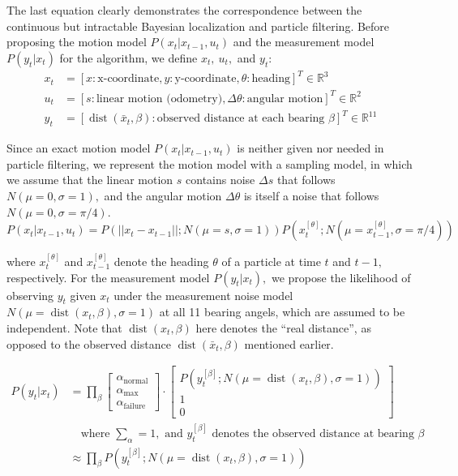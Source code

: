 \documentclass[11pt, a4paper]{article}
\newcommand{\R}{\mathbb{R}}
\begin{document}
The last equation clearly demonstrates the correspondence between the continuous but intractable Bayesian localization and particle filtering. Before proposing the motion model $P(x_t|x_{t-1},u_t)$ and the measurement model $P(y_t|x_t)$ for the algorithm, we define $x_t,\ u_t,$ and $y_t:$
\begin{align*}
x_t&=[x:\text{x-coordinate}, y:\text{y-coordinate}, \theta:\text{heading}]^T\in\R^3\\
u_t&=[s:\text{linear motion (odometry)}, \Delta\theta:\text{angular motion}]^T\in\R^2\\
y_t&=[\operatorname{dist}(\bar{x}_t, \beta):\text{observed distance at each bearing }\beta]^T\in\R^{11}
\end{align*}

Since an exact motion model $P(x_t|x_{t-1},u_t)$ is neither given nor needed in particle filtering, we represent the motion model with a sampling model, in which we assume that the linear motion $s$ contains noise $\Delta s$ that follows $N(\mu=0, \sigma=1),$ and the angular motion $\Delta\theta$ is itself a noise that follows $N(\mu=0, \sigma=\pi/4).$
\[P(x_t|x_{t-1},u_t)=P(||x_t-x_{t-1}||;N(\mu=s, \sigma=1))P(x_t^{[\theta]};N(\mu=x_{t-1}^{[\theta]}, \sigma=\pi/4))\]

where $x_t^{[\theta]}$ and $x_{t-1}^{[\theta]}$ denote the heading $\theta$ of a particle at time $t$ and $t-1,$ respectively. For the measurement model $P(y_t|x_t),$ we propose the likelihood of observing $y_t$ given $x_t$ under the measurement noise model $N(\mu=\operatorname{dist}(x_t, \beta), \sigma=1)$ at all 11 bearing angels, which are assumed to be independent. Note that $\operatorname{dist}(x_t, \beta)$ here denotes the ``real distance'', as opposed to the observed distance $\operatorname{dist}(\bar{x}_t, \beta)$ mentioned earlier.


\begin{align*}
P(y_t|x_t)&=\prod_{\beta}\left[
    \begin{array}{l}
    \alpha_{\text{normal}}\\
    \alpha_{\text{max}}\\
    \alpha_{\text{failure}}
    \end{array}
\right]\cdot\left[
    \begin{array}{c}
    P\left(y_t^{[\beta]}; N(\mu=\operatorname{dist}(x_t, \beta), \sigma=1)\right)\\
    1\\
    0
    \end{array}
\right]\\
&\quad\text{where }\sum_\alpha=1,\text{ and }y_t^{[\beta]}\text{ denotes the observed distance at bearing }\beta\\
&\approx\prod_{\beta}P\left(y_t^{[\beta]}; N(\mu=\operatorname{dist}(x_t, \beta), \sigma=1)\right)
\end{align*}
\end{document}
